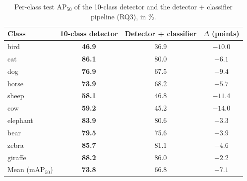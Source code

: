 \begin{table}[H]
\centering
\caption{Per-class test AP$_{50}$ of the 10-class detector and the detector + classifier pipeline (RQ3), in \%.}
\label{tab:two_stage}
\begin{threeparttable}
\begin{tabular}{lccc}
\toprule
Class & 10-class detector & Detector + classifier & $\Delta$ (points) \\
\midrule
bird & \textbf{46.9} & 36.9 & $-10.0$ \\
cat & \textbf{86.1} & 80.0 & \phantom{0}$-6.1$ \\
dog & \textbf{76.9} & 67.5 & \phantom{0}$-9.4$ \\
horse & \textbf{73.9} & 68.2 & \phantom{0}$-5.7$ \\
sheep & \textbf{58.1} & 46.8 & $-11.4$ \\
cow & \textbf{59.2} & 45.2 & $-14.0$ \\
elephant & \textbf{83.9} & 80.6 & \phantom{0}$-3.3$ \\
bear & \textbf{79.5} & 75.6 & \phantom{0}$-3.9$ \\
zebra & \textbf{85.7} & 81.1 & \phantom{0}$-4.6$ \\
giraffe & \textbf{88.2} & 86.0 & \phantom{0}$-2.2$ \\
\midrule
Mean (mAP$_{50}$) & \textbf{73.8} & 66.8 & \phantom{0}$-7.1$ \\
\bottomrule
\end{tabular}
\end{threeparttable}
\end{table}

